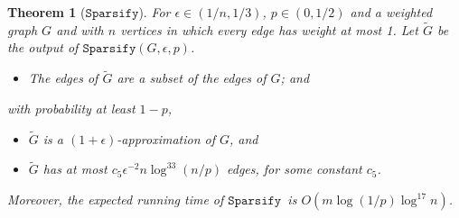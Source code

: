 \documentclass[11pt]{article}
\newtheorem{theorem}{Theorem}[section]
\newcommand{\sparsify}{\ensuremath{\mathtt{Sparsify}}}
\def\Gtil{\widetilde{G}}
\begin{document}
\begin{theorem}[\sparsify]\label{thm:sparsify}
For $\epsilon \in (1/n, 1/3)$, $p \in (0,1/2)$ and a weighted graph $G$
  and with $n$ vertices in which every edge has weight at most 1.
Let $\Gtil$ be the output of $\sparsify (G, \epsilon , p)$.
\begin{itemize}
\item [(X.1)] The edges of $\Gtil$ are a subset of the edges of $G$; and
\end{itemize}
with probability at least $1-p$,
\begin{itemize}
\item [(X.2)] $\Gtil$ is a $(1+\epsilon)$-approximation of $G$, and
\item [(X.3)] $\Gtil$ has at most
  $c_{5}  \epsilon^{-2}n \log^{33} (n/p)$
  edges, for some constant $c_{5}$.
\end{itemize}
Moreover, the expected running time of \sparsify  \ is 
  $O \left(m \log (1/p) \log^{17} n \right) $.
\end{theorem}
\end{document}
